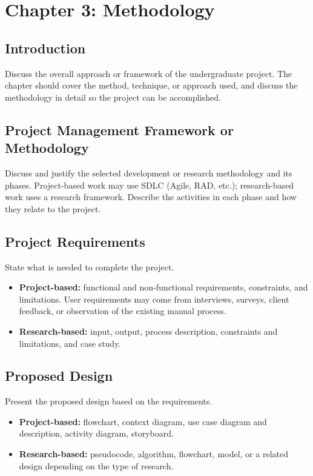 \section{Chapter 3: Methodology}

\subsection{Introduction}

Discuss the overall approach or framework of the undergraduate project. The chapter should cover the method, technique, or approach used, and discuss the methodology in detail so the project can be accomplished.

\subsection{Project Management Framework or Methodology}

Discuss and justify the selected development or research methodology and its phases. Project-based work may use SDLC (Agile, RAD, etc.); research-based work uses a research framework. Describe the activities in each phase and how they relate to the project.

\subsection{Project Requirements}

State what is needed to complete the project.

\begin{itemize}
    \item \textbf{Project-based:} functional and non-functional requirements, constraints, and limitations. User requirements may come from interviews, surveys, client feedback, or observation of the existing manual process.
    \item \textbf{Research-based:} input, output, process description, constraints and limitations, and case study.
\end{itemize}

\subsection{Proposed Design}

Present the proposed design based on the requirements.

\begin{itemize}
    \item \textbf{Project-based:} flowchart, context diagram, use case diagram and description, activity diagram, storyboard.
    \item \textbf{Research-based:} pseudocode, algorithm, flowchart, model, or a related design depending on the type of research.
\end{itemize}


